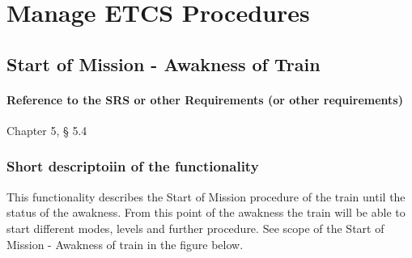 
\section{Manage ETCS Procedures}

\subsection{Start of Mission - Awakness of Train}%
\paragraph{Reference to the SRS or other Requirements (or other requirements)}
Chapter 5, § 5.4
\subsubsection{Short descriptoiin of the functionality}
This functionality describes the Start of Mission procedure of the train until the status of the awakness. From this point of the awakness the train will be able to start different modes, levels and further procedure.
See scope of the Start of Mission - Awakness of train in the figure below.

